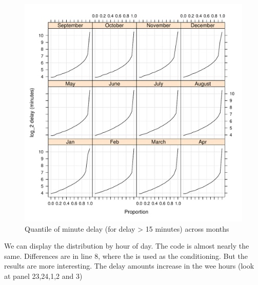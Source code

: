 \documentclass[letterpaper,10pt,english]{sphinxmanual}
\begin{document}
\begin{figure}[htbp]
\centering

\includegraphics{quantiles_by_month.pdf}
\caption{Quantile of minute delay (for delay \textgreater{} 15 minutes) across months}\end{figure}

We can display the distribution by hour of day. The code is almost nearly the
same. Differences are in line 8, where the  is used as the conditioning.
But the results are more interesting. The delay amounts increase in the wee
hours (look at panel 23,24,1,2 and 3)
\end{document}

